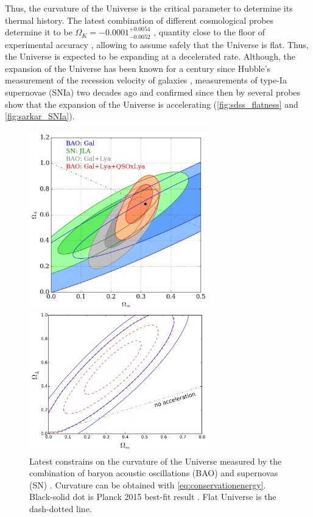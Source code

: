 Thus, the curvature of the Universe is the critical parameter to determine its thermal history. The latest combination of different cosmological probes determine it to be $\Omega_K = -0.0001^{+0.0054}_{-0.0052}$ \cite{2015arXiv150201589P}, quantity close to the floor of experimental accuracy \cite{2016PhRvD..94b3502L}, allowing to assume safely that the Universe is flat. Thus, the Universe is expected to be expanding at a decelerated rate. Although, the expansion of the Universe has been known for a century since Hubble's measurement of the recession velocity of galaxies \cite{1929PNAS...15..168H}, measurements of type-Ia supernovae (SNIa) two decades ago and  confirmed since then by several probes \cite{2008ARA&A..46..385F} show that the expansion of the Universe is accelerating (\autoref{fig:sdss_flatness} and \autoref{fig:sarkar_SNIa}).
\begin{figure}
\begin{center}
\includegraphics[width=0.7\textwidth]{./Pictures/omega_K_sdss.png}
\caption{Latest constrains on the curvature of the Universe measured by the combination of baryon acoustic oscillations (BAO) and supernovas (SN) \cite{2017arXiv170200176B}. Curvature can be obtained with \autoref{eq:conservationenergy}. Black-solid dot is Planck 2015 best-fit result \cite{2015arXiv150201589P}. Flat Universe is the dash-dotted line.}
\label{fig:sdss_flatness}
\vspace*{0.3cm}
\includegraphics[width=0.7\textwidth]{./Pictures/sarkar_acceleration.png}

\end{center}
\end{figure}
